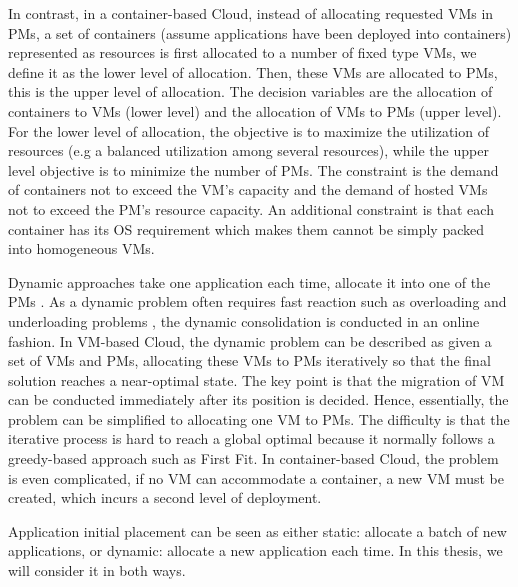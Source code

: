 In contrast, in a container-based Cloud, instead of allocating requested VMs in PMs, a set of containers (assume applications have been deployed into containers) represented as resources is first allocated to a number of fixed type VMs, we define it as the lower level of allocation. Then, these VMs are allocated to PMs, this is the upper level of allocation. The decision variables are the allocation of containers to VMs (lower level) and the allocation of VMs  to PMs (upper level). For the lower level of allocation, the objective is to maximize the utilization of resources (e.g a balanced utilization among several resources), while the upper level objective is to minimize the number of PMs. The constraint is the demand of containers not to exceed the VM's capacity and the demand of hosted VMs not to exceed the PM's resource capacity. An additional constraint is that each container has its OS requirement which makes them cannot be simply packed into homogeneous VMs. 

Dynamic approaches take one application each time, allocate it into one of the PMs \cite{Xiao:2015ik}. As a dynamic problem often requires fast reaction such as overloading and underloading problems \cite{Beloglazov:2013ht},
the dynamic consolidation is conducted in an online fashion. In VM-based Cloud, the dynamic problem can be described as given a set of VMs and PMs, allocating these VMs to PMs iteratively so that the final solution reaches a near-optimal state.
The key point is that the migration of VM can be conducted immediately after its position is decided. Hence, essentially, the problem can be simplified to allocating one VM to PMs. The difficulty is that the iterative process is hard to reach a global optimal because it normally follows a greedy-based approach such as First Fit. In container-based Cloud,  the problem is even complicated, if no VM can accommodate a container, a new VM must be created, which incurs a second level of deployment.

Application initial placement can be seen as either static: allocate a batch of new applications, or dynamic: allocate a new application each time. In this thesis, we will consider it in both ways.

